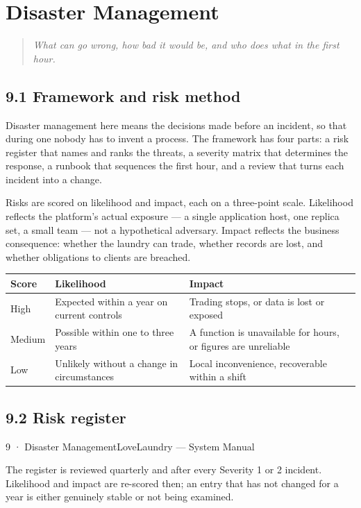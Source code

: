 \documentclass[11pt,a4paper,oneside]{book}
\begin{document}
\chapter{Disaster Management}
\begin{quote}\itshape What can go wrong, how bad it would be, and who does what in the first hour.\end{quote}
\section{9.1 Framework and risk method}
Disaster management here means the decisions made before an incident, so that during one nobody has to invent a process. The framework has four parts: a risk register that names and ranks the threats, a severity matrix that determines the response, a runbook that sequences the first hour, and a review that turns each incident into a change.

Risks are scored on likelihood and impact, each on a three-point scale. Likelihood reflects the platform's actual exposure — a single application host, one replica set, a small team — not a hypothetical adversary. Impact reflects the business consequence: whether the laundry can trade, whether records are lost, and whether obligations to clients are breached.

\begin{center}\small
\begin{tabularx}{\linewidth}{|X|X|X|}
\hline
\rowcolor{lightgrey}
\textbf{Score} & \textbf{Likelihood} & \textbf{Impact} \\ \hline
High & Expected within a year on current controls & Trading stops, or data is lost or exposed \\ \hline
Medium & Possible within one to three years & A function is unavailable for hours, or figures are unreliable \\ \hline
Low & Unlikely without a change in circumstances & Local inconvenience, recoverable within a shift \\ \hline
\end{tabularx}
\end{center}
\section{9.2 Risk register}
9 · Disaster ManagementLoveLaundry — System Manual

The register is reviewed quarterly and after every Severity 1 or 2 incident. Likelihood and impact are re-scored then; an entry that has not changed for a year is either genuinely stable or not being examined.
\end{document}
